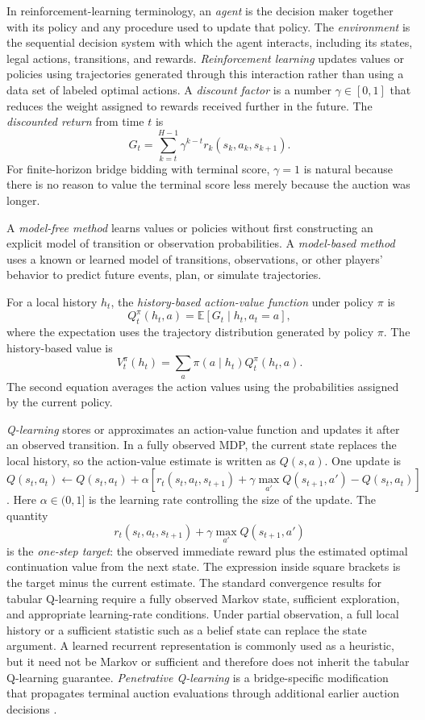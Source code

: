 In reinforcement-learning terminology, an \emph{agent} is the decision maker together with its policy and any procedure used to update that policy. The \emph{environment} is the sequential decision system with which the agent interacts, including its states, legal actions, transitions, and rewards. \emph{Reinforcement learning} updates values or policies using trajectories generated through this interaction rather than using a data set of labeled optimal actions. A \emph{discount factor} is a number $\gamma\in[0,1]$ that reduces the weight assigned to rewards received further in the future. The \emph{discounted return} from time $t$ is
\[
    G_t
    =
    \sum_{k=t}^{H-1}
    \gamma^{k-t}r_k(s_k,a_k,s_{k+1}).
\]
For finite-horizon bridge bidding with terminal score, $\gamma=1$ is natural because there is no reason to value the terminal score less merely because the auction was longer.

A \emph{model-free method} learns values or policies without first constructing an explicit model of transition or observation probabilities. A \emph{model-based method} uses a known or learned model of transitions, observations, or other players' behavior to predict future events, plan, or simulate trajectories.

For a local history $h_t$, the \emph{history-based action-value function} under policy $\pi$ is
\[
    Q_t^\pi(h_t,a)
    =
    \mathbb{E}
    \left[
      G_t
      \mid h_t,a_t=a
    \right],
\]
where the expectation uses the trajectory distribution generated by policy $\pi$. The history-based value is
\[
    V_t^\pi(h_t)
    =
    \sum_a
    \pi(a\mid h_t)Q_t^\pi(h_t,a).
\]
The second equation averages the action values using the probabilities assigned by the current policy.

\emph{Q-learning} stores or approximates an action-value function and updates it after an observed transition. In a fully observed MDP, the current state replaces the local history, so the action-value estimate is written as $Q(s,a)$. One update is
\[
    Q(s_t,a_t)
    \leftarrow
    Q(s_t,a_t)
    +
    \alpha
    \left[
      r_t(s_t,a_t,s_{t+1})
      +
      \gamma\max_{a'}Q(s_{t+1},a')
      -
      Q(s_t,a_t)
    \right]
\]
\cite{watkins1992qlearning}. Here $\alpha\in(0,1]$ is the learning rate controlling the size of the update. The quantity
\[
    r_t(s_t,a_t,s_{t+1})+\gamma\max_{a'}Q(s_{t+1},a')
\]
is the \emph{one-step target}: the observed immediate reward plus the estimated optimal continuation value from the next state. The expression inside square brackets is the target minus the current estimate. The standard convergence results for tabular Q-learning require a fully observed Markov state, sufficient exploration, and appropriate learning-rate conditions. Under partial observation, a full local history or a sufficient statistic such as a belief state can replace the state argument. A learned recurrent representation is commonly used as a heuristic, but it need not be Markov or sufficient and therefore does not inherit the tabular Q-learning guarantee. \emph{Penetrative Q-learning} is a bridge-specific modification that propagates terminal auction evaluations through additional earlier auction decisions \cite{yeh2016automatic}.


